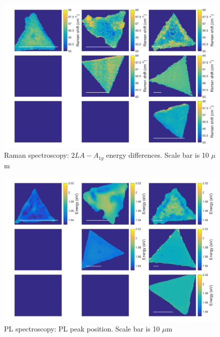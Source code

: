 \documentclass[12pt]{article}
\begin{document}
{\begin{figure}[h]
\begin{center}
\includegraphics[scale=0.3]{PaperSIMapsDifference.png}
\caption{Raman spectroscopy: $2LA-A_{1g}$ energy differences. Scale bar is 10 $\mu$m}
\label{fig:PaperSIMapsDifference}
\end{center}
\end{figure}

\begin{figure}[h]
\begin{center}
\includegraphics[scale=0.3]{PaperSIMapsPositionPL.png}
\caption{PL spectroscopy: PL peak position. Scale bar is 10 $\mu$m}
\label{fig:PaperSIMapsPositionPL}
\end{center}
\end{figure}

}
\end{document}
